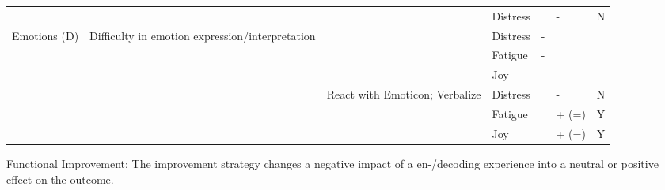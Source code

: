 \documentclass[man]{apa7}
\begin{document}
\begin{landscape}
\begin{table}
\begin{tabular}{lllllll}
                                   &                                                 &                                  & Distress            &             & -           & N                               \\
Emotions (D)                       & Difficulty in emotion expression/interpretation &                                  & Distress            & -           &             &                                 \\
                                   &                                                 &                                  & Fatigue             & -           &             &                                 \\
                                   &                                                 &                                  & Joy                 & -           &             &                                 \\
                                   &                                                 & React with Emoticon; Verbalize   & Distress            &             & -           & N                               \\
                                   &                                                 &                                  & Fatigue             &             & + (=)       & Y                               \\
                                   &                                                 &                                  & Joy                 &             & + (=)       & Y                              \\ \bottomrule
\end{tabular}
  \begin{tablenotes}
        {\tiny
            Functional Improvement: The improvement strategy changes a negative impact of a en-/decoding experience into a neutral or positive effect on the outcome.
         }
    \end{tablenotes}
\end{table}


\end{landscape}
\end{document}

